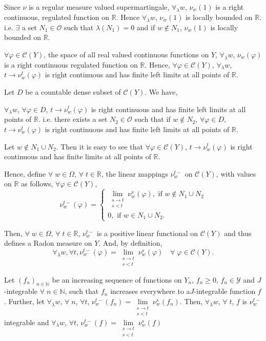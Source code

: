 Since $\nu$ is a regular measure valued supermartingale,
$\forall_\lambda w$, $\nu_w(1)$ is a right continuous, regulated
function on $\mathbb{R}$. Hence $\forall_\lambda w$, $\nu_w(1)$ is
locally bounded on $\mathbb{R}$. i.e. $\exists$ a set $N_1 \in
\mathscr{O}$ such that $\lambda(N_1) =0$ and if $w \not\in N_1$,
$\nu_w(1)$ is locally bounded on $\mathbb{R}$. 

$\forall \varphi \in \mathscr{C}(Y)$, the space of all real valued
continuous functions on $Y$, $\forall_\lambda w$, $\nu_w(\varphi)$ is
a right continuous regulated function on $\mathbb{R}$. Hence, $\forall
\varphi \in \mathscr{C} (Y)$, $\forall_\lambda w$, $t \to
\nu^t_w(\varphi)$ is right continuous and has finite left limits at
all points of $\mathbb{R}$. 

Let $D$ be a countable dense subset of $\mathscr{C}(Y)$. We have, 

$\forall_\lambda w$, $\forall \varphi \in D$, $t \to \nu^t_w(\varphi)$
is right continuous and has finite left limits at all points of
$\mathbb{R}$. i.e. there exists a set $N_2 \in \mathscr{O}$ such that
if $w \not\in N_2$, $\forall \varphi \in D$, $t \to \nu^t_w(\varphi)$
is right continuous and has finite left limits at all points of
$\mathbb{R}$. 

Let $w \not\in N_1 \cup N_2$. Then it is easy to see that $\forall
\varphi \in \mathscr{C}(Y)$, $t \to \nu^t_w(\varphi)$ is right
continuous and has finite limits at all points of $\mathbb{R}$. 

Hence, define $\forall \; w \in \Omega$, $\forall \; t \in
\mathbb{R}$, the linear mappings $\nu^{t-}_w$ on $\mathscr{C}(Y)$,
with values on $\mathbb{R}$ as follows, $\forall \varphi \in
\mathscr{C}(Y)$, 
$$
\nu^{t-}_w(\varphi) = 
\begin{cases}
\lim\limits_{\substack{s \to t\\s <t}} \nu^s_w(\varphi), \text{ if } w
\not\in N_1 \cup N_2\\
0, \text{ if } w \in N_1 \cup N_2. 
\end{cases}
$$

Then, $\forall \; w \in \Omega$, $\forall \; t \in \mathbb{R}$,
$\nu^{t-}_w$ is a positive linear functional on $\mathscr{C}(Y)$ and
thus defines a Radon measure on $Y$. And, by definition, 
$$
\forall_\lambda w, \forall t, \nu^{t-}_w(\varphi) =
\lim\limits_{\substack{s \to t\\s<t}} \nu^s_w(\varphi) \quad  \forall
\; \varphi \in \mathscr{C}(Y). 
$$

\begin{proposition}\label{part2:chap5:prop79}
Let $(f_n)_{n \in\mathbb{N}}$ be an increasing sequence of functions
on $Y_n$, $f_n \geq 0$, $f_n \in \mathscr{Y}$ and $J$-integrable
$\forall \; n \in \mathbb{N}$, such that $f_n$ increases everywhere to
a\pageoriginale $J$-integrable function $f$. Further, let
$\forall_\lambda w$, $\forall \; n$, $\forall t$, $\nu^{t-}_w(f_n) =
\lim\limits_{\substack{s\to t\\s<t}} \nu^s_w(f_n)$. Then,
$\forall_\lambda w$, $\forall \; t$, $f$ is $\nu^{t-}_w$ integrable
and $\forall_\lambda w$, $\forall t$, $\nu^{t-}_w(f) =
\lim\limits_{\substack{s\to t\\s<t}} \nu^s_w(f)$
\end{proposition}

